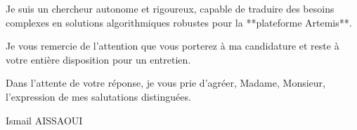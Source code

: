 \documentclass[11pt,a4paper]{article}
\begin{document}
Je suis un chercheur autonome et rigoureux, capable de traduire des besoins complexes en solutions algorithmiques robustes pour la **plateforme Artemis**.

Je vous remercie de l'attention que vous porterez à ma candidature et reste à votre entière disposition pour un entretien.

Dans l'attente de votre réponse, je vous prie d'agréer, Madame, Monsieur, l'expression de mes salutations distinguées.

\bigskip

\noindent Ismail AISSAOUI
\end{document}
